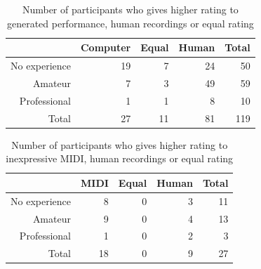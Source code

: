 \begin{table}
   \centering
   \caption{Number of participants who gives higher rating to generated performance, human recordings or equal rating}
   \label{tab:avg_count}
   \begin{tabular}{r|rrr|r}
      \hline
      &Computer&Equal&Human&Total\\
      \hline
      No experience&19&7&24&50\\
      Amateur&7&3&49&59\\
      Professional&1&1&8&10\\
      \hline
      Total&27&11&81&119\\
      \hline
   \end{tabular}
\end{table}

%
\begin{table}
   \centering
   \caption{Number of participants who gives higher rating to inexpressive MIDI, human recordings or equal rating}
   \label{tab:ctrl_avg_count}
   \begin{tabular}{r|rrr|r}
      \hline
      &MIDI&Equal&Human&Total\\
      \hline
      No experience&8&0&3&11\\
      Amateur&9&0&4&13\\
      Professional&1&0&2&3\\
      \hline
      Total&18&0&9&27\\
      \hline
   \end{tabular}
\end{table}

